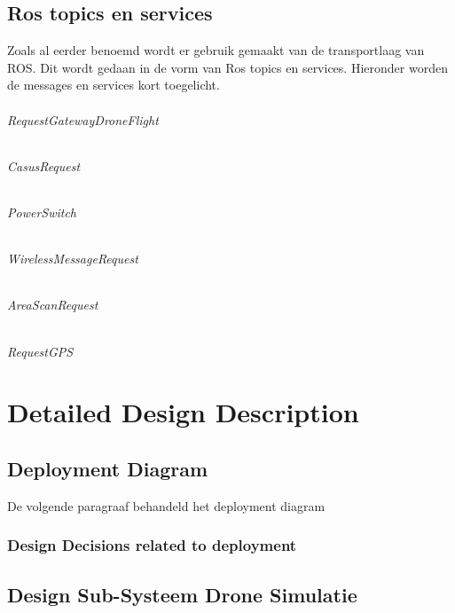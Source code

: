 \documentclass[a4paper, 11pt, oneside]{report}
\begin{document}
\section{Ros topics en services}
\label{architectural:ros_service_topic}
Zoals al eerder benoemd wordt er gebruik gemaakt van de transportlaag van ROS. Dit wordt gedaan in de vorm van Ros topics en services. Hieronder worden de messages en services kort toegelicht.

\subparagraph{RequestGatewayDroneFlight}
\label{architectural:ros:RequestGatewayDroneFlight}

\subparagraph{CasusRequest}
\label{architectural:ros_service:CasusRequest}

\subparagraph{PowerSwitch}
\label{architectural:ros_service:PowerSwitch}

\subparagraph{WirelessMessageRequest}
\label{architectural:ros_service:WirelessMessageRequest}

\subparagraph{AreaScanRequest}
\label{architectural:ros_service:AreaScanRequest}

\subparagraph{RequestGPS}
\label{architectural:ros_service:RequestGPS}

\chapter{Detailed Design Description}
\label{DetailedDesign}
\section{Deployment Diagram}
\label{DetailedDesign:deployment}
De volgende paragraaf behandeld het deployment diagram 



\subsection{Design Decisions related to deployment}
\label{DetailedDesign:deployment:decisisions}
\section{Design Sub-Systeem Drone Simulatie}
\label{DetailedDesign:DroneSimumlatie}
\end{document}
